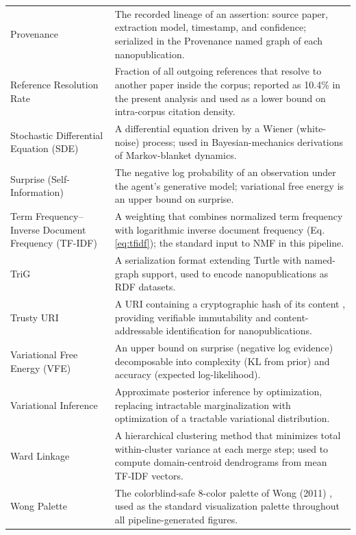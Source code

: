 \documentclass[
  english,
]{article}
\begin{document}
\begin{longtable}{p{4cm}p{11cm}}
Provenance & The recorded lineage of an assertion: source paper, extraction model, timestamp, and confidence; serialized in the Provenance named graph of each nanopublication. \\
Reference Resolution Rate & Fraction of all outgoing references that resolve to another paper inside the corpus; reported as 10.4\% in the present analysis and used as a lower bound on intra-corpus citation density. \\
Stochastic Differential Equation (SDE) & A differential equation driven by a Wiener (white-noise) process; used in Bayesian-mechanics derivations of Markov-blanket dynamics. \\
Surprise (Self-Information) & The negative log probability of an observation under the agent's generative model; variational free energy is an upper bound on surprise. \\
Term Frequency--Inverse Document Frequency (TF-IDF) & A weighting that combines normalized term frequency with logarithmic inverse document frequency (Eq. \ref{eq:tfidf}); the standard input to NMF in this pipeline. \\
TriG & A serialization format extending Turtle with named-graph support, used to encode nanopublications as RDF datasets. \\
Trusty URI & A URI containing a cryptographic hash of its content \citep{kuhn2014trusty}, providing verifiable immutability and content-addressable identification for nanopublications. \\
Variational Free Energy (VFE) & An upper bound on surprise (negative log evidence) decomposable into complexity (KL from prior) and accuracy (expected log-likelihood). \\
Variational Inference & Approximate posterior inference by optimization, replacing intractable marginalization with optimization of a tractable variational distribution. \\
Ward Linkage & A hierarchical clustering method that minimizes total within-cluster variance at each merge step; used to compute domain-centroid dendrograms from mean TF-IDF vectors. \\
Wong Palette & The colorblind-safe 8-color palette of Wong (2011) \citep{wong2011colorblind}, used as the standard visualization palette throughout all pipeline-generated figures. \\
\end{longtable}

\FloatBarrier

\newpage
\end{document}
